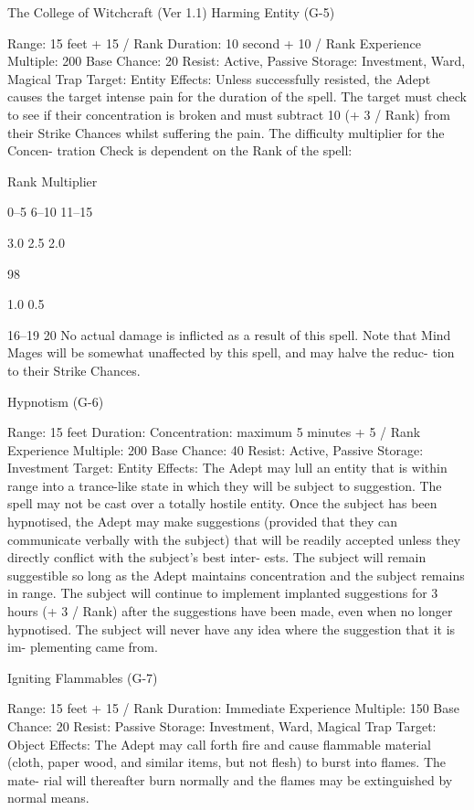 \begin{Chapter}{The College of Witchcraft (Ver 1.1)}
Harming Entity (G-5) 

Range: 15 feet + 15 / Rank 
Duration: 10 second + 10 / Rank 
Experience Multiple: 200 
Base Chance: 20%
Resist: Active, Passive 
Storage: Investment, Ward, Magical Trap 
Target: Entity 
Effects:  Unless  successfully  resisted,  the  Adept 
causes  the  target  intense  pain  for  the  duration  of 
the  spell.  The  target  must  check  to  see  if  their 
concentration is broken and must subtract 10 (+ 3 / 
Rank)  from  their  Strike  Chances  whilst  suffering 
the  pain.  The  difficulty  multiplier  for  the  Concen-
tration  Check  is  dependent  on  the  Rank  of  the 
spell: 

Rank  Multiplier 

0–5 
6–10 
11–15 

3.0 
2.5 
2.0 

98 

1.0 
0.5 

16–19 
20 
No  actual  damage  is  inflicted  as  a  result  of  this 
spell.  Note  that  Mind  Mages  will  be  somewhat 
unaffected  by  this  spell,  and  may  halve  the  reduc-
tion to their Strike Chances. 

Hypnotism (G-6) 

Range: 15 feet 
Duration: Concentration: maximum 5 minutes + 5 
/ Rank 
Experience Multiple: 200 
Base Chance: 40%
Resist: Active, Passive 
Storage: Investment 
Target: Entity 
Effects: The Adept may lull an entity that is within 
range into a trance-like state in which they will be 
subject  to  suggestion.  The  spell  may  not  be  cast 
over  a  totally  hostile  entity.  Once  the  subject  has 
been hypnotised, the Adept may make suggestions 
(provided that they can communicate verbally with 
the  subject)  that  will  be  readily  accepted  unless 
they  directly  conflict  with  the  subject’s  best  inter-
ests. The subject will remain suggestible so long as 
the  Adept  maintains  concentration  and  the  subject 
remains  in  range.  The  subject  will  continue  to 
implement implanted suggestions for 3 hours (+ 3 / 
Rank)  after  the  suggestions have  been  made,  even 
when no longer hypnotised. The subject will never 
have  any  idea  where  the  suggestion  that  it  is  im-
plementing came from. 

Igniting Flammables (G-7) 

Range: 15 feet + 15 / Rank 
Duration: Immediate 
Experience Multiple: 150 
Base Chance: 20%
Resist: Passive 
Storage: Investment, Ward, Magical Trap 
Target: Object 
Effects:  The  Adept  may  call  forth  fire  and  cause 
flammable material (cloth, paper wood, and similar 
items, but not flesh) to burst into flames. The mate-
rial  will  thereafter  burn  normally  and  the  flames 
may be extinguished by normal means. 


\end{Chapter}
